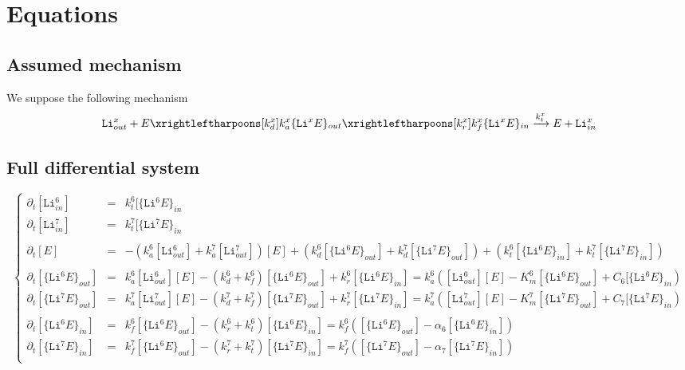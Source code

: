 \documentclass[aps,onecolumn]{revtex4}
\newcommand{\mychem}[1]{\mathtt{#1}}
\begin{document}
\section{Equations}
\subsection{Assumed mechanism}
We suppose the following mechanism
\begin{equation}
	\mychem{Li}^{x}_{out} + E \xrightleftharpoons[k_d^{x}]{k_a^{x}}
	\lbrace\mychem{Li}^xE\rbrace_{out} 
	\xrightleftharpoons[k_r^{x}]{k_f^{x}} 
	\lbrace\mychem{Li}^xE\rbrace_{in}
	\xrightarrow{k_t^x} E + \mychem{Li}^{x}_{in}
\end{equation}

\subsection{Full differential system}
\begin{equation}
	\left\lbrace
	\begin{array}{ccl}
	\partial_t [\mychem{Li}^6_{in}] & = &k_t^6[\lbrace\mychem{Li}^6E\rbrace_{in}  \\
	\partial_t [\mychem{Li}^7_{in}] & = &k_t^7[\lbrace\mychem{Li}^7E\rbrace_{in}  \\
	\\
	\partial_t [E] & = &
	-\left(k_a^6[\mychem{Li}^6_{out}]+k_a^7[\mychem{Li}^7_{out}]\right)[E] 
	+\left(k_d^6[\lbrace\mychem{Li}^6E\rbrace_{out}]+k_d^7[\lbrace\mychem{Li}^7E\rbrace_{out}]\right)
	+\left(k_t^6[\lbrace\mychem{Li}^6E\rbrace_{in} ]+k_t^7[\lbrace\mychem{Li}^7E\rbrace_{in} ]\right)
	\\
	\\
	\partial_t[\lbrace\mychem{Li}^6E\rbrace_{out}] & = & 
	k_a^6[\mathtt{Li}^6_{out}][E] - (k_d^6+k_f^6) [\lbrace\mychem{Li}^6E\rbrace_{out}]
	+k_r^6[\lbrace\mychem{Li}^6E\rbrace_{in}]
	= k_a^6 \left([\mathtt{Li}^6_{out}][E] -K_m^6 [\lbrace\mychem{Li}^6E\rbrace_{out}] + C_6 [\lbrace\mychem{Li}^6E\rbrace_{in}\right)
	\\
	\partial_t[\lbrace\mychem{Li}^7E\rbrace_{out}] & = & 
	k_a^7[\mathtt{Li}^7_{out}][E] - (k_d^7+k_f^7) [\lbrace\mychem{Li}^7E\rbrace_{out}]
	+k_r^7[\lbrace\mychem{Li}^7E\rbrace_{in}]
	= k_a^7 \left([\mathtt{Li}^7_{out}][E] -K_m^7 [\lbrace\mychem{Li}^7E\rbrace_{out}] + C_7 [\lbrace\mychem{Li}^7E\rbrace_{in}\right)
	\\
	\\
	\partial_t[\lbrace\mychem{Li}^6E\rbrace_{in}] & = & 
	k_f^6 [\lbrace\mychem{Li}^6E\rbrace_{out}] - (k_r^6+k_t^6) [\lbrace\mychem{Li}^6E\rbrace_{in}]
	= k_f^6 \left( [\lbrace\mychem{Li}^6E\rbrace_{out}] - \alpha_6 [\lbrace\mychem{Li}^6E\rbrace_{in}]\right)
	\\
	\partial_t[\lbrace\mychem{Li}^7E\rbrace_{in}] & = & 
	k_f^7 [\lbrace\mychem{Li}^6E\rbrace_{out}] - (k_r^7+k_t^7) [\lbrace\mychem{Li}^7E\rbrace_{in}]
	= k_f^7 \left( [\lbrace\mychem{Li}^7E\rbrace_{out}] - \alpha_7 [\lbrace\mychem{Li}^7E\rbrace_{in}]\right)
	\\
	\end{array}
	\right. 
\end{equation}
\end{document}
